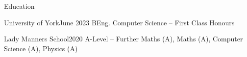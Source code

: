 \documentclass{structure}
\begin{document}

\begin{rSection}{Education}

    \begin{rSubsectionNoList}{University of York}{June 2023}{
            BEng. Computer Science -- First Class Honours
        }{}{}
    \end{rSubsectionNoList}

    \begin{rSubsectionNoList}{Lady Manners School}{2020}{
            A-Level --  Further Maths (A), Maths (A), Computer Science (A), Physics (A)
        }{}{}
    \end{rSubsectionNoList}

\end{rSection}


\end{document}
